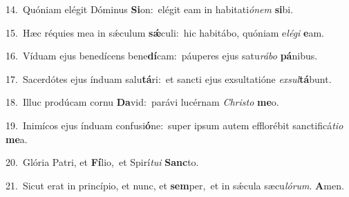 {\numbfont\textcolor{\numbcolor}{14.}}~Quóniam elégit Dóminus \textbf{Si}\-on:~\star elégit eam in habitati\-\textit{ó}\-\textit{nem} \textbf{si}\-bi.\par
{\numbfont\textcolor{\numbcolor}{15.}}~Hæc réquies mea in sǽculum \textbf{sǽ}\-culi:~\star hic habitábo, quóniam e\-\textit{lé}\-\textit{gi} \textbf{e}\-am.\par
{\numbfont\textcolor{\numbcolor}{16.}}~Víduam ejus benedícens bene\-\textbf{dí}\-cam:~\star páuperes ejus satu\-\textit{rá}\-\textit{bo} \textbf{pá}\-nibus.\par
{\numbfont\textcolor{\numbcolor}{17.}}~Sacerdótes ejus índuam salu\-\textbf{tá}\-ri:~\star et sancti ejus exsultatióne \textit{ex}\-\textit{sul}\textbf{tá}bunt.\par
{\numbfont\textcolor{\numbcolor}{18.}}~Illuc prodúcam cornu \textbf{Da}\-vid:~\star parávi lucérnam \textit{Chris}\-\textit{to} \textbf{me}\-o.\par
{\numbfont\textcolor{\numbcolor}{19.}}~Inimícos ejus índuam confusi\-\textbf{ó}\-ne:~\star super ipsum autem efflorébit sanctificá\-\textit{ti}\-\textit{o} \textbf{me}\-a.\par
{\numbfont\textcolor{\numbcolor}{20.}}~Glória Patri, et \textbf{Fí}\-lio,~\star et Spirí\-\textit{tu}\-\textit{i} \textbf{Sanc}\-to.\par
{\numbfont\textcolor{\numbcolor}{21.}}~Sicut erat in princípio, et nunc, et \textbf{sem}\-per,~\star et in sǽcula sæcu\-\textit{ló}\-\textit{rum}. \textbf{A}\-men.\par
